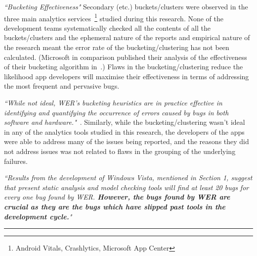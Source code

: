 \emph{``Bucketing Effectiveness"} Secondary (etc.) buckets/clusters were observed in the three main analytics services~\footnote{Android Vitals, Crashlytics, Microsoft App Center} studied during this research. None of the development teams systematically checked all the contents of all the buckets/clusters and the ephemeral nature of the reports and empirical nature of the research meant the error rate of the bucketing/clustering has not been calculated. (Microsoft in comparison published their analysis of the effectiveness of their bucketing algorithm in~\citep{kinshuman2009_debugging_in_the_very_large}.) Flaws in the bucketing/clustering reduce the likelihood app developers will maximise their effectiveness in terms of addressing the most frequent and pervasive bugs.

\emph{``While not ideal, WER's bucketing heuristics are in practice effective in identifying and quantifying the occurrence of errors caused by bugs in both software and hardware."}~\citep{kinshuman2009_debugging_in_the_very_large}. Similarly, while the bucketing/clustering wasn't ideal in any of the analytics tools studied in this research, the developers of the apps were able to address many of the issues being reported, and the reasons they did not address issues was not related to flaws in the grouping of the underlying failures.


\emph{``Results from the development of Windows Vista, mentioned in Section 1, suggest that present static analysis and model checking tools will find at least 20 bugs for every one bug found by WER. \textbf{However, the bugs found by WER are crucial as they are the bugs which have slipped past tools in the development cycle.}"}~\citep{kinshuman2009_debugging_in_the_very_large}

\par\noindent\rule{\textwidth}{0.4pt}
